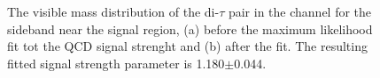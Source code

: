 \begin{figure}[h!]
\begin{center}
\end{center}
\caption{The visible mass distribution of the di-$\tau$ pair in the \mutau channel for the sideband near the signal region, (a) before
the maximum likelihood fit tot the QCD signal strenght and (b) after the fit. The resulting fitted signal strength parameter
is 1.180$\pm$0.044.}
\label{fig:mssm_qcdossss_mtnear}
\end{figure}

